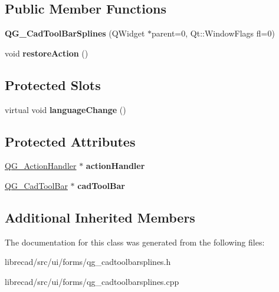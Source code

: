 \subsection*{Public Member Functions}
\begin{DoxyCompactItemize}
\item 
\hypertarget{classQG__CadToolBarSplines_a9f9a6d565f3dec5856418b169c42adf6}{{\bfseries Q\-G\-\_\-\-Cad\-Tool\-Bar\-Splines} (Q\-Widget $\ast$parent=0, Qt\-::\-Window\-Flags fl=0)}\label{classQG__CadToolBarSplines_a9f9a6d565f3dec5856418b169c42adf6}

\item 
\hypertarget{classQG__CadToolBarSplines_a87d2a8fb138fa6937016317cb6d7ab05}{void {\bfseries restore\-Action} ()}\label{classQG__CadToolBarSplines_a87d2a8fb138fa6937016317cb6d7ab05}

\end{DoxyCompactItemize}
\subsection*{Protected Slots}
\begin{DoxyCompactItemize}
\item 
\hypertarget{classQG__CadToolBarSplines_a3f5b09cf5dbd30f3b3ecae111f74c49a}{virtual void {\bfseries language\-Change} ()}\label{classQG__CadToolBarSplines_a3f5b09cf5dbd30f3b3ecae111f74c49a}

\end{DoxyCompactItemize}
\subsection*{Protected Attributes}
\begin{DoxyCompactItemize}
\item 
\hypertarget{classQG__CadToolBarSplines_a4308791f0694482911a3a624ee932546}{\hyperlink{classQG__ActionHandler}{Q\-G\-\_\-\-Action\-Handler} $\ast$ {\bfseries action\-Handler}}\label{classQG__CadToolBarSplines_a4308791f0694482911a3a624ee932546}

\item 
\hypertarget{classQG__CadToolBarSplines_ace3c4317e4728ed3e0ff5f109d886965}{\hyperlink{classQG__CadToolBar}{Q\-G\-\_\-\-Cad\-Tool\-Bar} $\ast$ {\bfseries cad\-Tool\-Bar}}\label{classQG__CadToolBarSplines_ace3c4317e4728ed3e0ff5f109d886965}

\end{DoxyCompactItemize}
\subsection*{Additional Inherited Members}


The documentation for this class was generated from the following files\-:\begin{DoxyCompactItemize}
\item 
librecad/src/ui/forms/qg\-\_\-cadtoolbarsplines.\-h\item 
librecad/src/ui/forms/qg\-\_\-cadtoolbarsplines.\-cpp\end{DoxyCompactItemize}
